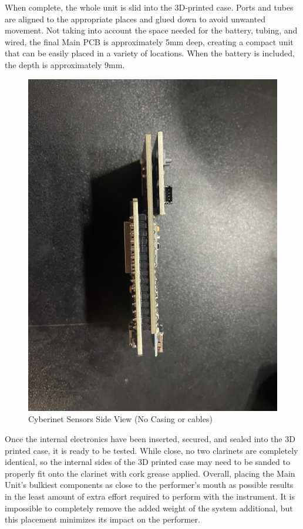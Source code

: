 When complete, the whole unit is slid into the 3D-printed case. Ports and tubes are aligned to the appropriate places and glued down to avoid unwanted movement. Not taking into account the space needed for the battery, tubing, and wired, the final Main PCB is approximately 5mm deep, creating a compact unit that can be easily placed in a variety of locations. When the battery is included, the depth is approximately 9mm.

\begin{center}
    \begin{figure}
        \centering
        \includegraphics[scale=0.05]{diagrams/PCBs/cyberinetThin.JPG}
        \caption{Cyberinet Sensors Side View (No Casing or cables)}
        \label{fig:Cyberinetside}
    \end{figure}
\end{center}

Once the internal electronics have been inserted, secured, and sealed into the 3D printed case, it is ready to be tested. While close, no two clarinets are completely identical, so the internal sides of the 3D printed case may need to be sanded to properly fit onto the clarinet with cork grease applied. Overall, placing the Main Unit's bulkiest components as close to the performer's mouth as possible results in the least amount of extra effort required to perform with the instrument. It is impossible to completely remove the added weight of the system additional, but this placement minimizes its impact on the performer.




